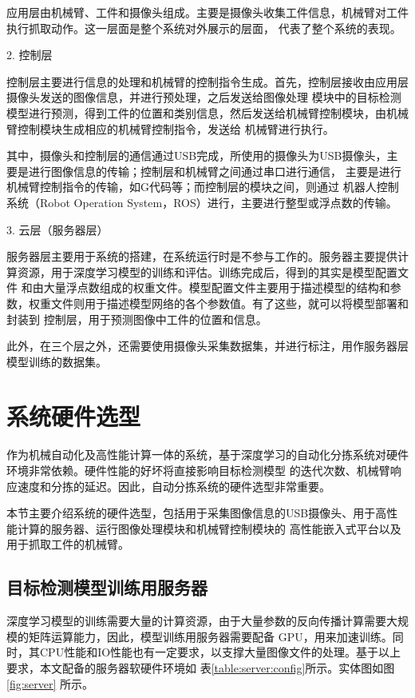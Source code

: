 应用层由机械臂、工件和摄像头组成。主要是摄像头收集工件信息，机械臂对工件执行抓取动作。这一层面是整个系统对外展示的层面，
代表了整个系统的表现。

2. 控制层

控制层主要进行信息的处理和机械臂的控制指令生成。首先，控制层接收由应用层摄像头发送的图像信息，并进行预处理，之后发送给图像处理
模块中的目标检测模型进行预测，得到工件的位置和类别信息，然后发送给机械臂控制模块，由机械臂控制模块生成相应的机械臂控制指令，发送给
机械臂进行执行。

其中，摄像头和控制层的通信通过USB完成，所使用的摄像头为USB摄像头，主要是进行图像信息的传输；控制层和机械臂之间通过串口进行通信，
主要是进行机械臂控制指令的传输，如G代码等；而控制层的模块之间，则通过
机器人控制系统（Robot Operation System，ROS）进行，主要进行整型或浮点数的传输。

3. 云层（服务器层）

服务器层主要用于系统的搭建，在系统运行时是不参与工作的。服务器主要提供计算资源，用于深度学习模型的训练和评估。训练完成后，得到的其实是模型配置文件
和由大量浮点数组成的权重文件。模型配置文件主要用于描述模型的结构和参数，权重文件则用于描述模型网络的各个参数值。有了这些，就可以将模型部署和封装到
控制层，用于预测图像中工件的位置和信息。

此外，在三个层之外，还需要使用摄像头采集数据集，并进行标注，用作服务器层模型训练的数据集。

\section{系统硬件选型}

作为机械自动化及高性能计算一体的系统，基于深度学习的自动化分拣系统对硬件环境非常依赖。硬件性能的好坏将直接影响目标检测模型
的迭代次数、机械臂响应速度和分拣的延迟。因此，自动分拣系统的硬件选型非常重要。

本节主要介绍系统的硬件选型，包括用于采集图像信息的USB摄像头、用于高性能计算的服务器、运行图像处理模块和机械臂控制模块的
高性能嵌入式平台以及用于抓取工件的机械臂。

\subsection{目标检测模型训练用服务器}

深度学习模型的训练需要大量的计算资源，由于大量参数的反向传播计算需要大规模的矩阵运算能力，因此，模型训练用服务器需要配备
GPU，用来加速训练。同时，其CPU性能和IO性能也有一定要求，以支撑大量图像文件的处理。基于以上要求，本文配备的服务器软硬件环境如
表\ref{table:server:config}所示。实体图如图 \ref{fig:server} 所示。


